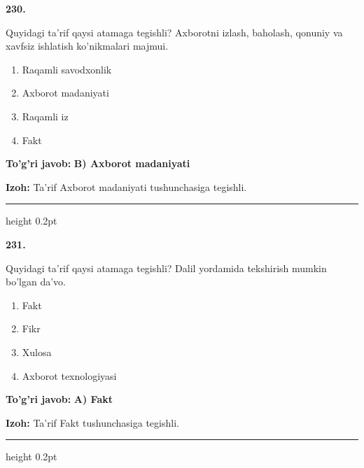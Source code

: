 \documentclass[10pt,a4paper,oneside]{article}
\begin{document}
\noindent\textbf{\color{ink}230.}
\par
Quyidagi ta'rif qaysi atamaga tegishli? Axborotni izlash, baholash, qonuniy va xavfsiz ishlatish ko'nikmalari majmui.
\begin{enumerate}[label=\Alph*),leftmargin=9mm]
\item Raqamli savodxonlik
\item Axborot madaniyati
\item Raqamli iz
\item Fakt
\end{enumerate}
\begin{tcolorbox}[enhanced,breakable,colback=teal!4,colframe=teal!50!black,boxrule=0.5pt,arc=1.1mm,left=3mm,right=3mm,top=1.7mm,bottom=1.7mm,before skip=2mm,after skip=2mm]
\textbf{\color{teal}To'g'ri javob:} \textbf{B) Axborot madaniyati}
\par\smallskip
\textbf{Izoh:} Ta'rif Axborot madaniyati tushunchasiga tegishli.
\end{tcolorbox}
\vspace{2mm}\hrule height 0.2pt \vspace{3mm}

\noindent\textbf{\color{ink}231.}
\par
Quyidagi ta'rif qaysi atamaga tegishli? Dalil yordamida tekshirish mumkin bo'lgan da'vo.
\begin{enumerate}[label=\Alph*),leftmargin=9mm]
\item Fakt
\item Fikr
\item Xulosa
\item Axborot texnologiyasi
\end{enumerate}
\begin{tcolorbox}[enhanced,breakable,colback=teal!4,colframe=teal!50!black,boxrule=0.5pt,arc=1.1mm,left=3mm,right=3mm,top=1.7mm,bottom=1.7mm,before skip=2mm,after skip=2mm]
\textbf{\color{teal}To'g'ri javob:} \textbf{A) Fakt}
\par\smallskip
\textbf{Izoh:} Ta'rif Fakt tushunchasiga tegishli.
\end{tcolorbox}
\vspace{2mm}\hrule height 0.2pt \vspace{3mm}
\end{document}
